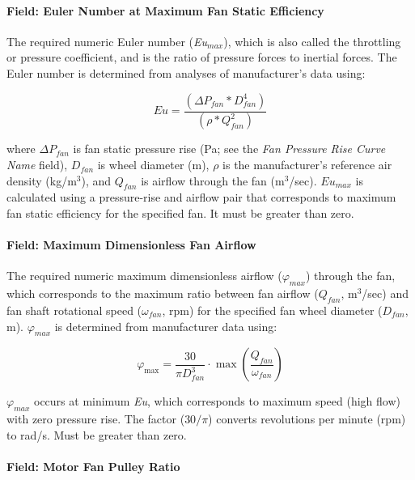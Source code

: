 \paragraph{Field: Euler Number at Maximum Fan Static Efficiency}\label{field-euler-number-at-maximum-fan-static-efficiency}

The required numeric Euler number (\emph{Eu\(_{max}\)}), which is also called the throttling or pressure coefficient, and is the ratio of pressure forces to inertial forces. The Euler number is determined from analyses of manufacturer's data using:

\begin{equation}
Eu = \frac{{\left( {\Delta {P_{fan}} * D_{fan}^4} \right)}}{{\left( {\rho  * Q_{fan}^2} \right)}}
\end{equation}

where \(\Delta P_{fan}\) is fan static pressure rise (Pa; see the \emph{Fan Pressure Rise Curve Name} field), \(D_{fan}\) is wheel diameter (m), \(\rho\) is the manufacturer's reference air density (kg/m\(^{3}\)), and \(Q_{fan}\) is airflow through the fan (m\(^{3}\)/sec). \(Eu_{max}\) is calculated using a pressure-rise and airflow pair that corresponds to maximum fan static efficiency for the specified fan. It must be greater than zero.

\paragraph{Field: Maximum Dimensionless Fan Airflow}\label{field-maximum-dimensionless-fan-airflow}

The required numeric maximum dimensionless airflow (\(\varphi_{max}\)) through the fan, which corresponds to the maximum ratio between fan airflow (\(Q_{fan}\), m\(^{3}\)/sec) and fan shaft rotational speed (\(\omega_{fan}\), rpm) for the specified fan wheel diameter (\(D_{fan}\), m). \(\varphi_{max}\) is determined from manufacturer data using:

\begin{equation}
\varphi_{\max} = \frac{30}{\pi D_{fan}^3} \cdot \max \left( \frac{Q_{fan}}{\omega_{fan}} \right)
\end{equation}

\(\varphi_{max}\) occurs at minimum \emph{Eu}, which corresponds to maximum speed (high flow) with zero pressure rise. The factor (\(30/\pi\)) converts revolutions per minute (rpm) to rad/s. Must be greater than zero.

\paragraph{Field: Motor Fan Pulley Ratio}\label{field-motor-fan-pulley-ratio}

